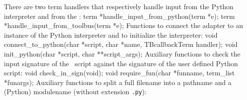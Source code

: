 There are two term handlers that respectively handle input from the
Python interpreter and from the \TB:
\nwenddocs{}\endmoddef\let\nwnotused=\nwoutput{}\nwstartdeflinemarkup{}\nwenddeflinemarkup
term *handle_input_from_python(term *e);
term *handle_input_from_toolbus(term *e);
\nwendcode{}\nwdocspar
Functions to connect the adapter to an instance of the Python
interpreter and to initialize the interpreter:
\nwenddocs{}\plusendmoddef\let\nwnotused=\nwoutput{}\nwstartdeflinemarkup{}\nwenddeflinemarkup
void connect_to_python(char *script, char *name, TBcallbackTerm handler);
void init_python(char *script, char **script_args);
\nwendcode{}\nwdocspar
Auxiliary functions to check the input signature of the \TB\ script 
against the signature of the user defined Python script:
\nwenddocs{}\plusendmoddef\let\nwnotused=\nwoutput{}\nwstartdeflinemarkup{}\nwenddeflinemarkup
void check_in_sign(void);
void require_fun(char *funname, term_list *funargs);
\nwendcode{}\nwdocspar
Auxiliary functions to split a full filename into a pathname and a 
(Python) modulename (without extension \texttt{.py}):
\nwenddocs{}\plusendmoddef\let\nwnotused=\nwoutput{}\nwstartdeflinemarkup{}\nwenddeflinemarkup
